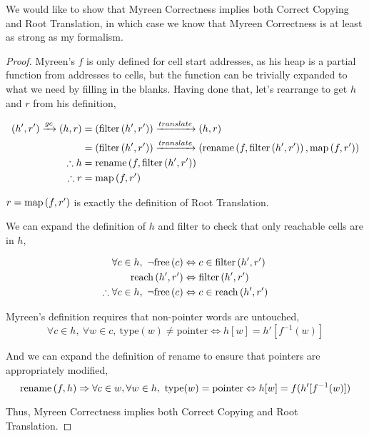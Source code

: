 \begin{theorem}
  We would like to show that Myreen Correctness implies both Correct
  Copying and Root Translation, in which case we know that Myreen
  Correctness is at least as strong as my formalism.

  \begin{proof}
    Myreen's $f$ is only defined for cell start addresses, as his heap
    is a partial function from addresses to cells, but the function
    can be trivially expanded to what we need by filling in the
    blanks. Having done that, let's rearrange to get $h$ and $r$ from
    his definition,

    \begin{align*}
      (h', r') \xrightarrow{gc} (h, r) &= (\mathrm{filter}\left(h', r'\right)) \xrightarrow{translate} (h, r)\\
      &= (\mathrm{filter}\left(h', r'\right)) \xrightarrow{translate} (\mathrm{rename}\left(f, \mathrm{filter}\left(h', r'\right)\right), \mathrm{map}\left(f, r'\right))\\
      \therefore h &= \mathrm{rename}\left(f, \mathrm{filter}\left(h', r'\right)\right)\\
      \therefore r &= \mathrm{map}\left(f, r'\right)
    \end{align*}

    $r = \mathrm{map}\left(f, r'\right)$ is exactly the definition of Root Translation.

    We can expand the definition of $h$ and filter to check that only
    reachable cells are in $h$,

    \begin{align*}
      \forall c \in h,\ \lnot\mathrm{free}\left(c\right) &\Leftrightarrow c \in \mathrm{filter}\left(h', r'\right)\\
      \mathrm{reach}\left(h', r'\right) &\Leftrightarrow \mathrm{filter}\left(h', r'\right)\\
      \therefore \forall c \in h,\ \lnot\mathrm{free}\left(c\right) &\Leftrightarrow c \in \mathrm{reach}\left(h', r'\right)
    \end{align*}

    Myreen's definition requires that non-pointer words are
    untouched, \[\forall c \in h,\ \forall w \in c,\ \mathrm{type}(w)
    \neq \mathrm{pointer} \iff h[w] = h'[f^{-1}(w)]\]

    And we can expand the definition of rename to ensure that pointers
    are appropriately modified, \[\mathrm{rename}\left(f, h\right) \Rightarrow \forall c \in
    w, \forall w \in h,\ \mathrm{type}(w) = \mathrm{pointer} \Leftrightarrow h[w]
    = f(h'[f^{-1}(w)])\]

    Thus, Myreen Correctness implies both Correct Copying and Root
    Translation.
  \end{proof}
\end{theorem}


